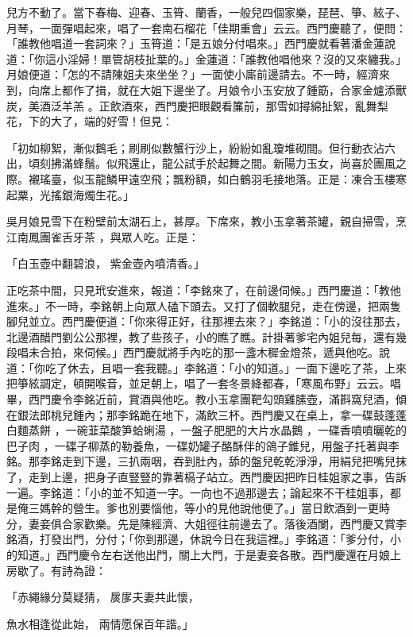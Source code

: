 \begin{showcontents}{}
兒方不動了。當下春梅、迎春、玉筲、蘭香，一般兒四個家樂，琵琶、箏、絃子、月琴，一面彈唱起來，唱了一套南石榴花「佳期重會」云云。西門慶聽了，便問：「誰教他唱道一套詞來？」玉筲道：「是五娘分付唱來。」西門慶就看著潘金蓮說道：「你這小淫婦！單管胡枝扯葉的。」金蓮道：「誰教他唱他來？沒的又來纏我。」月娘便道：「怎的不請陳姐夫來坐坐？」一面使小廝前邊請去。不一時，經濟來到，向席上都作了揖，就在大姐下邊坐了。月娘令小玉安放了鍾筯，合家金爐添獸炭，美酒泛羊羔 。正飲酒來，西門慶把眼觀看簾前，那雪如撏綿扯絮，亂舞梨花，下的大了，端的好雪！但見：

「初如柳絮，漸似鵝毛；刷刷似數蟹行沙上，紛紛如亂瓊堆砌間。但行動衣沾六出，頃刻拂滿蜂鬚。似飛還止，龍公試手於起舞之間。新陽力玉女，尚喜於團風之際。襯瑤臺，似玉龍鱗甲遠空飛；飄粉額，如白鶴羽毛接地落。正是：凍合玉樓寒起粟，光搖銀海燭生花。」

吳月娘見雪下在粉壁前太湖石上，甚厚。下席來，教小玉拿著茶罐，親自掃雪，烹江南鳳團雀舌牙茶 ，與眾人吃。正是：

「白玉壺中翻碧浪， 紫金壺內噴清香。」

正吃茶中間，只見玳安進來，報道：「李銘來了，在前邊伺候。」西門慶道：「教他進來。」不一時，李銘朝上向眾人磕下頭去。又打了個軟腿兒，走在傍邊，把兩隻腳兒並立。西門慶便道：「你來得正好，往那裡去來？」李銘道：「小的沒往那去，北邊酒醋門劉公公那裡，教了些孩子，小的瞧了瞧。計掛著爹宅內姐兒每，還有幾段唱未合拍，來伺候。」西門慶就將手內吃的那一盞木穉金燈茶，遞與他吃。說道：「你吃了休去，且唱一套我聽。」李銘道：「小的知道。」一面下邊吃了茶，上來把箏絃調定，頓開喉音，並足朝上，唱了一套冬景絳都春，「寒風布野」云云。唱畢，西門慶令李銘近前，賞酒與他吃。教小玉拿團靶勾頭雞膆壺，滿斟窩兒酒，傾在銀法郎桃兒鍾內；那李銘跪在地下，滿飲三杯。西門慶又在桌上，拿一碟鼓蓬蓬白麵蒸餅 ，一碗韮菜酸笋蛤蜊湯 ，一盤子肥肥的大片水晶鵝 ，一碟香噴噴曬乾的巴子肉 ，一碟子柳蒸的勒養魚，一碟奶罐子酪酥伴的鴿子錐兒，用盤子托著與李銘。那李銘走到下邊，三扒兩咽，吞到肚內，舔的盤兒乾乾淨淨，用絹兒把嘴兒抹了，走到上邊，把身子直豎豎的靠著槅子站立。西門慶因把昨日桂姐家之事，告訴一遍。李銘道：「小的並不知道一字。一向也不過那邊去；論起來不干桂姐事，都是俺三媽幹的營生。爹也別要惱他，等小的見他說他便了。」當日飲酒到一更時分，妻妾俱合家歡樂。先是陳經濟、大姐徑往前邊去了。落後酒闌，西門慶又賞李銘酒，打發出門，分付；「你到那邊，休說今日在我這裡。」李銘道：「爹分付，小的知道。」西門慶令左右送他出門，關上大門，于是妻妾各散。西門慶還在月娘上房歇了。有詩為證：

「赤繩緣分莫疑猜， 扊扅夫妻共此懷，

魚水相逢從此始， 兩情愿保百年諧。」


\end{showcontents}
